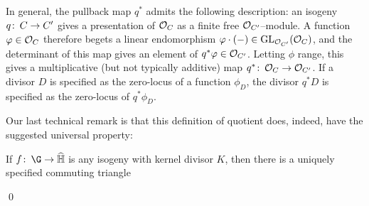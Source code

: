 \begin{remark}
In general, the pullback map \(q^*\) admits the following description: an isogeny \(q\colon\thinspace C \to C'\) gives a presentation of \(\mathcal{O}_C\) as a finite free \(\mathcal{O}_{C'}\)--module.  A function \(\varphi \in \mathcal{O}_C\) therefore begets a linear endomorphism \(\varphi \cdot (-) \in \operatorname{GL}_{\mathcal{O}_{C'}}(\mathcal{O}_C)\), and the determinant of this map gives an element of \(q^* \varphi \in \mathcal{O}_{C'}\).  Letting \(\phi\) range, this gives a multiplicative (but not typically additive) map \(q^*\colon\thinspace \mathcal{O}_C \to \mathcal{O}_{C'}\).  If a divisor \(D\) is specified as the zero-locus of a function \(\phi_D\), the divisor \(q^* D\) is specified as the zero-locus of \(q^* \phi_D\).
\end{remark}

Our last technical remark is that this definition of quotient does, indeed, have the suggested universal property:

\begin{lemma}
If \(f\co \G \to \widehat{\mathbb H}\) is any isogeny with kernel divisor \(K\), then there is a uniquely specified commuting triangle
\begin{center}
\end{center}
\qed
\end{lemma}

